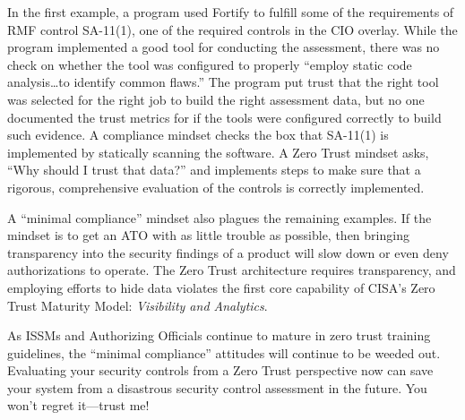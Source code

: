 In the first example, a program used Fortify to fulfill some of the requirements of RMF control SA-11(1), one of the required controls in the CIO overlay. While the program implemented a good tool for conducting the assessment, there was no check on whether the tool was configured to properly ``employ static code analysis\ldots to identify common flaws.'' The program put trust that the right tool was selected for the right job to build the right assessment data, but no one documented the trust metrics for if the tools were configured correctly to build such evidence. A compliance mindset checks the box that SA-11(1) is implemented by statically scanning the software. A Zero Trust mindset asks, ``Why should I trust that data?'' and implements steps to make sure that a rigorous, comprehensive evaluation of the controls is correctly implemented.\autocite{20240610:nist800207}

A ``minimal compliance'' mindset also plagues the remaining examples. If the mindset is to get an ATO with as little trouble as possible, then bringing transparency into the security findings of a product will slow down or even deny authorizations to operate. The Zero Trust architecture requires transparency, and employing efforts to hide data violates the first core capability of CISA's Zero Trust Maturity Model: \textit{Visibility and Analytics}.\autocite{20240610:cisa} 

As ISSMs and Authorizing Officials continue to mature in zero trust training guidelines, the ``minimal compliance'' attitudes will continue to be weeded out. Evaluating your security controls from a Zero Trust perspective now can save your system from a disastrous security control assessment in the future. You won't regret it---trust me!
